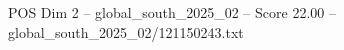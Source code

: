 \begin{textsample}{POS Dim 2 – global\_south\_2025\_02 – Score 22.00 – global\_south\_2025\_02/121150243.txt}
\end{textsample}

